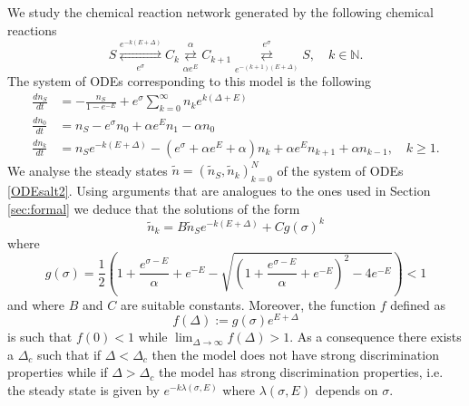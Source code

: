 \documentclass{article}
\numberwithin{equation}{section}
\theoremstyle{plain}
\begin{document}
We study the chemical reaction network generated by the following chemical reactions 
\begin{equation}\label{cycleDelta1}
S \overset{e^{- k (E+\Delta) } }{\underset{e^{\sigma }} \rightleftarrows} C_k  \overset{\alpha  }{\underset{\alpha e^E }\rightleftarrows } C_{k+1} \overset{e^{\sigma  }}{\underset{e^{- (k+1)(E+\Delta) }} \rightleftarrows} S, \quad  k  \in \mathbb N. 
\end{equation}
The system of ODEs corresponding to this model is the following 
\begin{align}\label{ODEsalt2}
    \frac{d n_S }{dt} &= - \frac{n_S}{1-e^{-E}} + e^{\sigma }  \sum_{k=0}^{\infty} n_k e^{k (\Delta+E) } \nonumber \\
    \frac{d n_0 }{dt} &= n_S  - e^{\sigma } n_0 + \alpha e^E n_1 - \alpha  n_0 \nonumber \\
        \frac{d n_k }{dt} &= n_S e^{- k (E+\Delta) } - \left( e^{\sigma } + \alpha e^E + \alpha \right)  n_k + \alpha e^E n_{k+1}  + \alpha  n_{k-1} , \quad k \geq 1. 
\end{align}
We analyse the steady states $\tilde{n}=(\tilde{n}_S, \tilde{n}_k)_{k=0}^N $ of the system of ODEs \eqref{ODEsalt2}.
Using arguments that are analogues to the ones used in Section \ref{sec:formal} we deduce that the solutions of the form 
\[
\tilde{n}_k = B \tilde{n}_S e^{- k (E+\Delta) } + C g(\sigma)^k 
\]
where 
\[
g(\sigma) = \frac{1}{2 } \left( 1+ \frac{e^{\sigma-E}}{\alpha} + e^{-E} - \sqrt{ \left(1+ \frac{e^{\sigma-E}}{\alpha} +e^{-E } \right)^2 - 4 e^{- E }} \right) < 1 \] 
and where $B $ and $C$ are suitable constants. 
Moreover, the function $f$ defined as
\[
f(\Delta):= g(\sigma ) e^{ E+\Delta }  
\]
is such that $f(0)<1 $ while $\lim_{\Delta  \to \infty } f(\Delta ) >1$.
As a consequence there exists a $\Delta_c $ such that if $\Delta < \Delta_c $ then the model does not have strong discrimination properties while if $\Delta > \Delta_c $ the model has strong discrimination properties, i.e. the steady state is given  by $e^{- k \lambda(\sigma, E) } $ where $\lambda(\sigma, E) $ depends on $\sigma$. 
\end{document}
